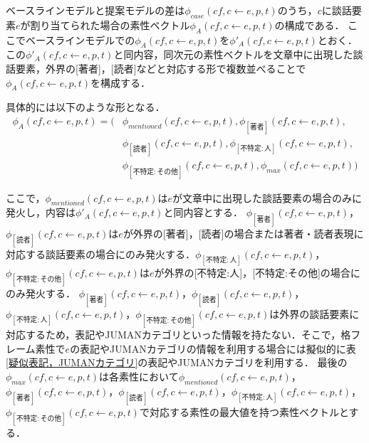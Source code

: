 \documentclass[japanese]{jnlp_1.4}
\begin{document}
ベースラインモデルと提案モデルの差は$\phi_\mathit{case}(\mathit{cf},c \leftarrow e,p,t)$のうち，$c$に談話要素$e$が割り当てられた場合の素性ベクトル$\phi_{A}(\mathit{cf},c \leftarrow e,p,t)$の構成である．
ここでベースラインモデルでの$\phi_{A}(\mathit{cf},c \leftarrow e,p,t)$を$\phi'_{A}(\mathit{cf},c \leftarrow e,p,t)$とおく．
この$\phi'_{A}(\mathit{cf},c \leftarrow e,p,t)$と同内容，同次元の素性ベクトルを文章中に出現した談話要素，外界の[著者]，[読者]などと対応する形で複数並べることで$\phi_{A}(\mathit{cf},c \leftarrow e,p,t)$を構成する．

具体的には以下のような形となる．
\begin{align*}
 \phi_{A}(\mathit{cf},c \leftarrow e,p,t)  = (&\phi_\mathit{mentioned}(\mathit{cf},c \leftarrow e,p,t),\phi_{[著者]}(\mathit{cf},c \leftarrow e,p,t),\\
  & \phi_{[読者]}(\mathit{cf},c \leftarrow e,p,t),\phi_{[不特定:人]}(\mathit{cf},c \leftarrow e,p,t),\\
  & \phi_{[不特定:その他]}(\mathit{cf},c \leftarrow e,p,t),\phi_\mathit{max}(\mathit{cf},c \leftarrow e,p,t) )
\end{align*}

ここで，$\phi_\mathit{mentioned}(\mathit{cf},c \leftarrow e,p,t)$は$e$が文章中に出現した談話要素の場合のみに発火し，内容は$\phi'_{A}(\mathit{cf},c \leftarrow e,p,t)$と同内容とする．
$\phi_{[著者]}(\mathit{cf},c \leftarrow e,p,t)$，$\phi_{[読者]}(\mathit{cf},c \leftarrow e,p,t)$は$e$が外界の[著者]，[読者]の場合または著者・読者表現に対応する談話要素の場合にのみ発火する．$\phi_{[不特定:人]}(\mathit{cf},c \leftarrow e,p,t)$，$\phi_{[不特定:その他]}(\mathit{cf},c \leftarrow e,p,t)$は$e$が外界の[不特定:人]，[不特定:その他]の場合にのみ発火する．
$\phi_{[著者]}(\mathit{cf},c \leftarrow e,p,t)$，$\phi_{[読者]}(\mathit{cf},c \leftarrow e,p,t)$，$\phi_{[不特定:人]}(\mathit{cf},c \leftarrow e,p,t)$，$\phi_{[不特定:その他]}(\mathit{cf},c \leftarrow e,p,t)$は外界の談話要素に対応するため，表記やJUMANカテゴリといった情報を持たない．そこで，格フレーム素性で$e$の表記やJUMANカテゴリの情報を利用する場合には擬似的に表\ref{疑似表記，JUMANカテゴリ}の表記やJUMANカテゴリを利用する．
最後の$\phi_\mathit{max}(\mathit{cf},c \leftarrow e,p,t)$は各素性において$\phi_\mathit{mentioned}(\mathit{cf},c \leftarrow e,p,t)$，$\phi_{[著者]}(\mathit{cf},c \leftarrow e,p,t)$，$\phi_{[読者]}(\mathit{cf},c \leftarrow e,p,t)$，$\phi_{[不特定:人]}(\mathit{cf},c \leftarrow e,p,t)$，$\phi_{[不特定:その他]}(\mathit{cf},c \leftarrow e,p,t)$で対応する素性の最大値を持つ素性ベクトルとする．
\end{document}
